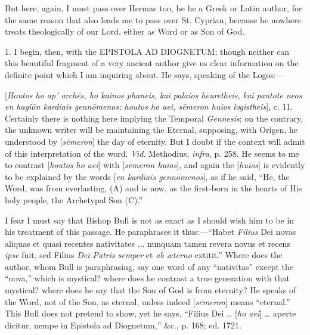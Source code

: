 But here, again, I must pass over Hermas too, be he a Greek or
Latin author, for the same reason that also leads me to pass over St.
Cyprian, because he nowhere treats theologically of our Lord, either
as Word or as Son of God.

1. I begin, then, with the EPISTOLA AD
DIOGNETUM; though neither can this beautiful
fragment of a very ancient author give us clear information on the
definite point which I am inquiring about. He says, speaking of the
Logos:—

[\emph{Houtos ho ap' arch\={e}s, ho kainos phaneis, kai palaios
heuretheis, kai pantote neos en hagi\={o}n kardiais genn\={o}menos;
houtos ho aei, s\={e}meron huios logistheis}], c. 11. Certainly
there is nothing here implying the Temporal \emph{Gennesis}; on the
contrary, the unknown writer will be maintaining the Eternal,
supposing, with Origen, he understood by [\emph{s\={e}meron}] the
day of eternity. But I doubt if the context will admit of this
interpretation of the word. \emph{Vid}. Methodius, \emph{infra}, p.
258. He seems to me to contrast [\emph{houtos ho aei}] with [\emph{s\={e}meron
huios}], and again the [\emph{huios}] is evidently to be explained
by the words [\emph{en kardiais genn\={o}menos}], as if he said,
``He, the Word, was from everlasting, (A) and is now, as the
first-born in the hearts of His holy people, the Archetypal Son
(C).''

I fear I must say that Bishop Bull is not as exact as I should wish
him to be in his treatment of this passage. He paraphrases it thus:—``Habet
\emph{Filius} Dei novas aliquas et quasi recentes nativitates ...
nunquam tamen revera novus et recens \emph{ipse} fuit, sed Filius \emph{Dei
Patris semper} et \emph{ab æterno} extitit.'' Where does the
author, whom Bull is paraphrasing, say one word of any ``nativitas''
except the ``nova,'' which is mystical? where does he contrast
a true generation with that mystical? where does he say that the Son
of God is from eternity? He speaks of the Word, not of the Son, as
eternal, unless indeed [\emph{s\={e}meron}] means
``eternal.'' This Bull does not pretend to show, yet he says,
``Filius Dei … [\emph{ho aei}] … aperte dicitur, nempe in
Epistola ad Diognetum,'' \&c., p. 168; ed. 1721.

